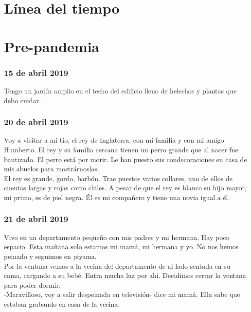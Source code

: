 \documentclass[12pt]{book}
\begin{document}
\chapter{Línea del tiempo}

\startchronology
\startchronology
[startyear=2019,stopyear=2021]
\stopchronology


\chapter{Pre-pandemia}

\subsection*{\hfill 15 de abril 2019}

Tengo un jardín amplio en el techo del edificio lleno de helechos y plantas que debo cuidar.

\subsection*{\hfill 20 de abril 2019}

Voy a visitar a mi tío, el rey de Inglaterra, con mi familia y con mi amigo Humberto. El rey y su familia cercana tienen un perro grande que al nacer fue bautizado. El perro está por morir. Le han puesto sus condecoraciones en casa de mis abuelos para mostrárnoslas.
\\
El rey es grande, gordo, barbón. Trae puestos varios collares, uno de ellos de cuentas largas y rojas como chiles. A pesar de que el rey es blanco su hijo mayor, mi primo, es de piel negra. Él es mi compañero y tiene una novia igual a él.

\subsection*{\hfill 21 de abril 2019}

Vivo en un departamento pequeño con mis padres y mi hermana. Hay poco espacio. Esta mañana solo estamos mi mamá, mi hermana y yo. No nos hemos peinado y seguimos en piyama. 
\\
Por la ventana vemos a la vecina del departamento de al lado sentada en su cama, cargando a su bebé. Entra mucha luz por ahí. Decidimos cerrar la ventana para poder dormir.
\\
-Maravilloso, voy a salir despeinada en televisión- dice mi mamá. Ella sabe que estaban grabando en casa de la vecina.
\end{document}
